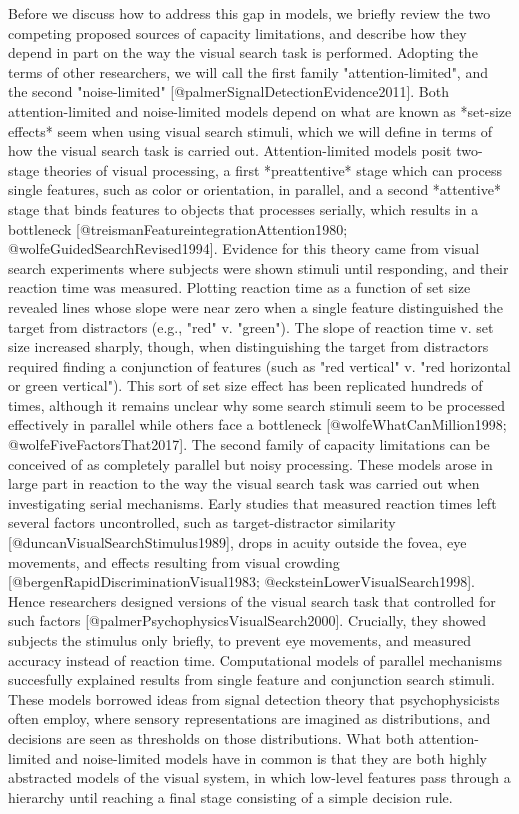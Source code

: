 \documentclass[10pt,letterpaper]{article}
\begin{document}
Before we discuss how to address this gap in models, we briefly review the two competing 
proposed sources of capacity limitations, and describe how they depend in part on the 
way the visual search task is performed. Adopting the terms of other researchers, we will 
call the first family "attention-limited", and the second "noise-limited" 
[@palmerSignalDetectionEvidence2011]. Both attention-limited and noise-limited models 
depend on what are known as *set-size effects* seem when using visual search stimuli, 
which we will define in terms of how the visual search task is carried out. 
Attention-limited models posit two-stage theories of visual processing, a first 
*preattentive* stage which can process single features, such as color or orientation, 
in parallel, and a second *attentive* stage that binds features to objects that processes 
serially, which results in a bottleneck [@treismanFeatureintegrationAttention1980; 
@wolfeGuidedSearchRevised1994]. Evidence for this theory came from visual search 
experiments where subjects were shown stimuli until responding, and their reaction time 
was measured. Plotting reaction time as a function of set size revealed 
lines whose slope were near zero when a single feature distinguished the target from 
distractors (e.g., "red" v. "green"). The slope of reaction time v. set size increased 
sharply, though, when distinguishing the target from distractors required finding a 
conjunction of features (such as "red vertical" v. "red horizontal or green vertical"). 
This sort of set size effect has been replicated hundreds of times, although it remains 
unclear why some search stimuli seem to be processed effectively in parallel while others 
face a bottleneck [@wolfeWhatCanMillion1998; @wolfeFiveFactorsThat2017].
The second family of capacity limitations can be conceived of as completely parallel but 
noisy processing. These models arose in large part in reaction 
to the way the visual search task was carried out when investigating
serial mechanisms. Early studies that measured reaction times left several factors 
uncontrolled, such as target-distractor similarity [@duncanVisualSearchStimulus1989], 
drops in acuity outside the fovea, eye movements, and effects resulting from visual 
crowding [@bergenRapidDiscriminationVisual1983; @ecksteinLowerVisualSearch1998]. 
Hence researchers designed versions of the visual search task that controlled for such 
factors [@palmerPsychophysicsVisualSearch2000]. Crucially, they showed subjects the 
stimulus only briefly, to prevent eye movements, and measured accuracy instead of reaction
time. Computational models of parallel mechanisms succesfully explained results from 
single feature and conjunction search stimuli. These models borrowed ideas from signal 
detection theory that psychophysicists often employ, where sensory representations are
imagined as distributions, and decisions are seen as thresholds on those distributions.
What both attention-limited and noise-limited models have in common is that they are 
both highly abstracted models of the visual system, in which low-level features pass 
through a hierarchy until reaching a final stage consisting of a simple decision rule.
\end{document}
